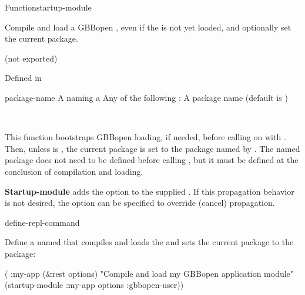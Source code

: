 \documentclass[10pt,twoside,english,pdftex]{article}
\begin{document}
\begin{functiondoc}{Function}{startup-module}%
  {}
%
% 
%
%
%
%
%

\fnsyntax 

\fnpurpose Compile and load a GBBopen , even if the
 is not yet loaded, and
optionally set the current package.

\fnpackage {} (not exported)

\fnmodule Defined in 

\fnargs
\begin{args}{package-name}
 A  naming a 
\arg[option] Any of the following : 
\compilemoduleoptions
{} A package name (default is \nil)
\end{args}

\fnerrors
\modulenotdefined\\
\relativedircircularity

\fndescription This function bootstraps GBBopen loading, if needed, before
calling  on
 with .  Then, unless
 is \nil, the current package is set to the package
named by .  The named package does not need to be
defined before calling , but it must be defined
at the conclusion of  compilation and loading.

%
%
%
\textbf{Startup-module} adds the option  to the
supplied .  If this propagation behavior is not desired,
the  option can be specified to override (cancel)
propagation.

\begin{alsos}{define-repl-command}
\end{alsos}

\fnexample
%
Define a  named  that compiles and
loads the   and sets the current package to
the  package:
%
\W\supp
\begin{example}
  ( :my-app (&rest options)
    "Compile and load my GBBopen application module"
    (startup-module :my-app options :gbbopen-user))
\end{example} 

\end{functiondoc}
\end{document}
